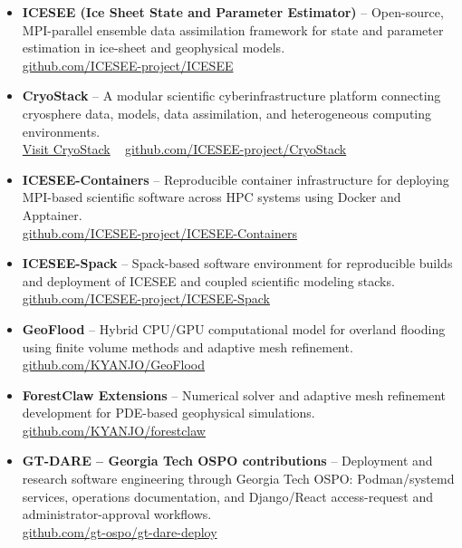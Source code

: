 \documentclass[11pt]{article}
\newcommand{\githublink}[1]{%
\href{https://github.com/#1}{github.com/#1}%
}
\begin{document}
\begin{itemize}[leftmargin=1.2em, itemsep=4pt, topsep=2pt]

\item \textbf{ICESEE (Ice Sheet State and Parameter Estimator)} --
Open-source, MPI-parallel ensemble data assimilation framework for state and parameter estimation in ice-sheet and geophysical models.\\
\githublink{ICESEE-project/ICESEE}

\item \textbf{CryoStack} --
A modular scientific cyberinfrastructure platform connecting cryosphere data, models, data assimilation, and heterogeneous computing environments.\\
\href{https://cryostack.eas.gatech.edu/}{Visit CryoStack} \textbar\ \githublink{ICESEE-project/CryoStack}

\item \textbf{ICESEE-Containers} --
Reproducible container infrastructure for deploying MPI-based scientific software across HPC systems using Docker and Apptainer.\\
\githublink{ICESEE-project/ICESEE-Containers}

\item \textbf{ICESEE-Spack} --
Spack-based software environment for reproducible builds and deployment of ICESEE and coupled scientific modeling stacks.\\
\githublink{ICESEE-project/ICESEE-Spack}

\item \textbf{GeoFlood} --
Hybrid CPU/GPU computational model for overland flooding using finite volume methods and adaptive mesh refinement.\\
\githublink{KYANJO/GeoFlood}

\item \textbf{ForestClaw Extensions} --
Numerical solver and adaptive mesh refinement development for PDE-based geophysical simulations.\\
\githublink{KYANJO/forestclaw}

\item \textbf{GT-DARE -- Georgia Tech OSPO contributions} --
Deployment and research software engineering through Georgia Tech OSPO: Podman/systemd services, operations documentation, and Django/React access-request and administrator-approval workflows.\\
\githublink{gt-ospo/gt-dare-deploy}

\end{itemize}
\end{document}
